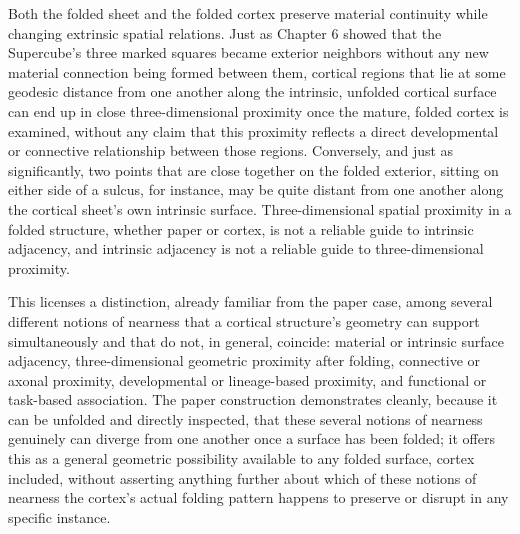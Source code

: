 \documentclass[11pt,oneside]{book}
\begin{document}
Both the folded sheet and the folded cortex preserve material continuity
while changing extrinsic spatial relations. Just as Chapter 6 showed
that the Supercube's three marked squares became exterior neighbors
without any new material connection being formed between them, cortical
regions that lie at some geodesic distance from one another along the
intrinsic, unfolded cortical surface can end up in close
three-dimensional proximity once the mature, folded cortex is examined,
without any claim that this proximity reflects a direct developmental or
connective relationship between those regions. Conversely, and just as
significantly, two points that are close together on the folded
exterior, sitting on either side of a sulcus, for instance, may be quite
distant from one another along the cortical sheet's own intrinsic
surface. Three-dimensional spatial proximity in a folded structure,
whether paper or cortex, is not a reliable guide to intrinsic adjacency,
and intrinsic adjacency is not a reliable guide to three-dimensional
proximity.

This licenses a distinction, already familiar from the paper case, among
several different notions of nearness that a cortical structure's
geometry can support simultaneously and that do not, in general,
coincide: material or intrinsic surface adjacency, three-dimensional
geometric proximity after folding, connective or axonal proximity,
developmental or lineage-based proximity, and functional or task-based
association. The paper construction demonstrates cleanly, because it can
be unfolded and directly inspected, that these several notions of
nearness genuinely can diverge from one another once a surface has been
folded; it offers this as a general geometric possibility available to
any folded surface, cortex included, without asserting anything further
about which of these notions of nearness the cortex's actual folding
pattern happens to preserve or disrupt in any specific instance.
\end{document}
